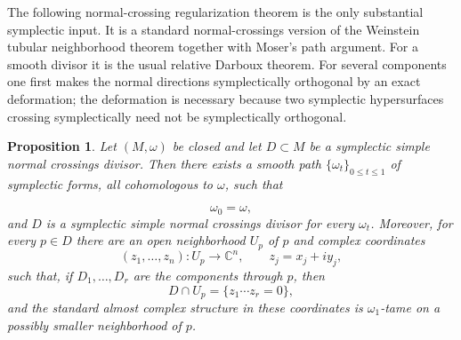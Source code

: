 \documentclass{amsart}
\newtheorem{proposition}{Proposition}
\theoremstyle{definition}
\newcommand{\C}{\mathbb C}
\begin{document}
The following normal-crossing regularization theorem is the only substantial symplectic
input. It is a standard normal-crossings version of the Weinstein tubular neighborhood
theorem together with Moser's path argument. For a smooth divisor it is the usual relative
Darboux theorem. For several components one first makes the normal directions symplectically
orthogonal by an exact deformation; the deformation is necessary because two symplectic
hypersurfaces crossing symplectically need not be symplectically orthogonal.

\begin{proposition}\label{prop:normal-form}
Let $(M,\omega)$ be closed and let $D\subset M$ be a symplectic simple normal crossings
divisor. Then there exists a smooth path $\{\omega_t\}_{0\le t\le 1}$ of symplectic forms,
all cohomologous to $\omega$, such that

\[
\omega_0=\omega,
\]
and $D$ is a symplectic simple normal crossings divisor for every $\omega_t$. Moreover,
for every $p\in D$ there are an open neighborhood $U_p$ of $p$ and complex coordinates
\[
(z_1,\dots,z_n):U_p\to \C^n,
\qquad z_j=x_j+i y_j,
\]
such that, if $D_1,\dots,D_r$ are the components through $p$, then
\[
D\cap U_p=\{z_1\cdots z_r=0\},
\]
and the standard almost complex structure in these coordinates is $\omega_1$-tame on a
possibly smaller neighborhood of $p$.
\end{proposition}
\end{document}
